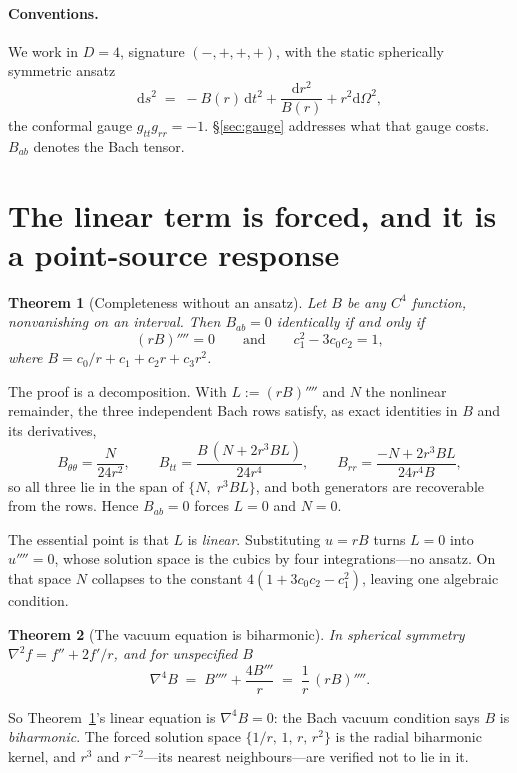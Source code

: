 \documentclass[11pt]{article}
\newtheorem{theorem}{Theorem}[section]
\theoremstyle{definition}
\theoremstyle{remark}
\newcommand{\dd}{\mathrm d}
\begin{document}
\paragraph{Conventions.}
We work in \(D=4\), signature \((-,+,+,+)\), with the static spherically
symmetric ansatz
\[
  \dd s^{2} \;=\; -B(r)\,\dd t^{2} + \frac{\dd r^{2}}{B(r)}
  + r^{2}\dd\Omega^{2},
\]
the conformal gauge \(g_{tt}g_{rr}=-1\).  \S\ref{sec:gauge} addresses what
that gauge costs.  \(B_{ab}\) denotes the Bach tensor.

\section{The linear term is forced, and it is a point-source response}
\label{sec:forced}

\begin{theorem}[Completeness without an ansatz]
\label{thm:complete}
Let \(B\) be any \(C^{4}\) function, nonvanishing on an interval.  Then
\(B_{ab}=0\) identically if and only if
\[
  (rB)'''' = 0
  \qquad\text{and}\qquad
  c_{1}^{2}-3c_{0}c_{2}=1,
\]
where \(B=c_{0}/r+c_{1}+c_{2}r+c_{3}r^{2}\).
\end{theorem}

The proof is a decomposition.  With \(L:=(rB)''''\) and \(N\) the nonlinear
remainder, the three independent Bach rows satisfy, as exact identities in
\(B\) and its derivatives,
\[
  B_{\theta\theta}=\frac{N}{24r^{2}},\qquad
  B_{tt}=\frac{B\,(N+2r^{3}BL)}{24r^{4}},\qquad
  B_{rr}=\frac{-N+2r^{3}BL}{24r^{4}B},
\]
so all three lie in the span of \(\{N,\;r^{3}BL\}\), and both generators are
recoverable from the rows.  Hence \(B_{ab}=0\) forces \(L=0\) and \(N=0\).

The essential point is that \(L\) is \emph{linear}.  Substituting \(u=rB\)
turns \(L=0\) into \(u''''=0\), whose solution space is the cubics by four
integrations---no ansatz.  On that space \(N\) collapses to the constant
\(4(1+3c_{0}c_{2}-c_{1}^{2})\), leaving one algebraic condition.

\begin{theorem}[The vacuum equation is biharmonic]
\label{thm:biharm}
In spherical symmetry \(\nabla^{2}f=f''+2f'/r\), and for unspecified \(B\)
\[
  \nabla^{4}B \;=\; B''''+\frac{4B'''}{r} \;=\; \frac{1}{r}\,(rB)''''.
\]
\end{theorem}

So Theorem~\ref{thm:complete}'s linear equation is \(\nabla^{4}B=0\): the
Bach vacuum condition says \(B\) is \emph{biharmonic}.  The forced solution
space \(\{1/r,\,1,\,r,\,r^{2}\}\) is the radial biharmonic kernel, and
\(r^{3}\) and \(r^{-2}\)---its nearest neighbours---are verified not to lie
in it.
\end{document}
